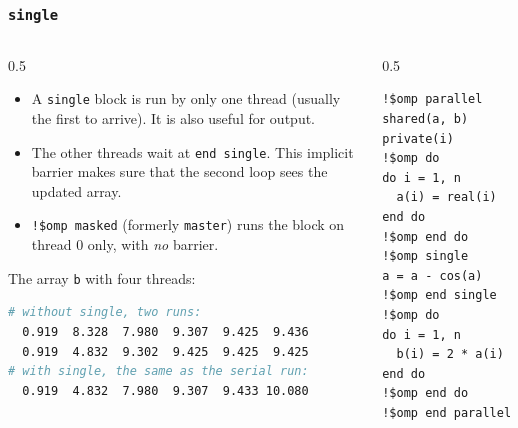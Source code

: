 \begin{frame}[fragile]
  \frametitle{\texttt{single}}
  \begin{columns}[T]
    \begin{column}{0.5\textwidth}
      \begin{itemize}
        \item A \texttt{single} block is run by only one thread (usually the first to arrive). It is also useful for output.
        \item The other threads wait at \texttt{end single}. This implicit barrier makes sure that the second loop sees the updated array.
        \item \texttt{!\$omp masked} (formerly \texttt{master}) runs the block on thread 0 only, with \emph{no} barrier.
      \end{itemize}

      The array \texttt{b} with four threads:
      \begin{lstlisting}[language=bash]
# without single, two runs:
  0.919  8.328  7.980  9.307  9.425  9.436
  0.919  4.832  9.302  9.425  9.425  9.425
# with single, the same as the serial run:
  0.919  4.832  7.980  9.307  9.433 10.080
      \end{lstlisting}
    \end{column}

    \begin{column}{0.5\textwidth}
      \begin{lstlisting}
!$omp parallel shared(a, b) private(i)
!$omp do
do i = 1, n
  a(i) = real(i)
end do
!$omp end do
!$omp single
a = a - cos(a)
!$omp end single
!$omp do
do i = 1, n
  b(i) = 2 * a(i)
end do
!$omp end do
!$omp end parallel
      \end{lstlisting}
    \end{column}
  \end{columns}
\end{frame}


